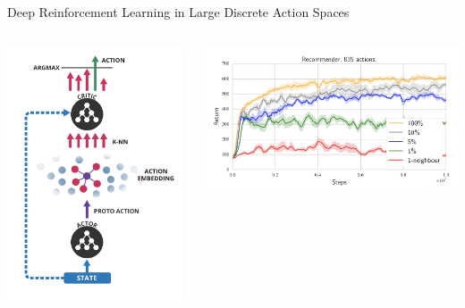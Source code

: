 \documentclass[11pt,aspectratio=169]{beamer}
\begin{document}
\begin{frame}{Deep Reinforcement Learning in Large Discrete Action Spaces \cite{DDPG}}

\begin{columns}
\begin{column}{0.4\textwidth}
\begin{center}
\includegraphics[scale=0.25]{images/ddpg.png}
\end{center}
\end{column}

\begin{column}{0.5\textwidth}
\begin{center}
\includegraphics[scale=0.25]{images/ddpg-result.png}
\end{center}
\end{column}
\end{columns}


\end{frame}
\end{document}
